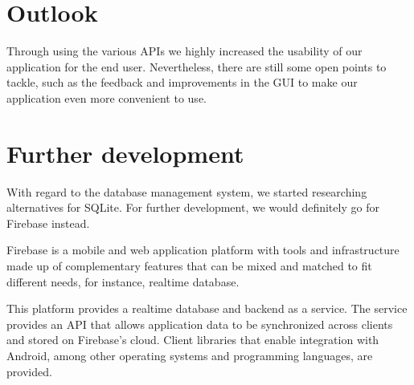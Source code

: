 \documentclass[11pt,twoside,a4paper]{report}
\begin{document}
\section{Outlook}

Through using the various APIs we highly increased the usability of our application for the end user. Nevertheless, there are still some open points to tackle, such as the feedback and improvements in the GUI to make our application even more convenient to use.

\section{Further development}

With regard to the database management system, we started researching alternatives for SQLite. For further development, we would definitely go for Firebase instead. 

Firebase is a mobile and web application platform with tools and infrastructure made up of complementary features that can be mixed and matched to fit different needs, for instance, realtime database.

This platform provides a realtime database and backend as a service. The service provides an API that allows application data to be synchronized across clients and stored on Firebase's cloud. Client libraries that enable integration with Android, among other operating systems and programming languages, are provided.
\end{document}
